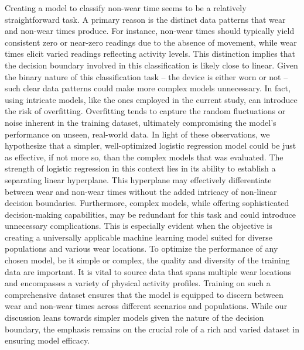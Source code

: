 \documentclass[
  10pt,
]{scrbook}
\begin{document}
Creating a model to classify non-wear time seems to be a relatively
straightforward task. A primary reason is the distinct data patterns
that wear and non-wear times produce. For instance, non-wear times
should typically yield consistent zero or near-zero readings due to the
absence of movement, while wear times elicit varied readings reflecting
activity levels. This distinction implies that the decision boundary
involved in this classification is likely close to linear. Given the
binary nature of this classification task -- the device is either worn
or not -- such clear data patterns could make more complex models
unnecessary. In fact, using intricate models, like the ones employed in
the current study, can introduce the risk of overfitting. Overfitting
tends to capture the random fluctuations or noise inherent in the
training dataset, ultimately compromising the model's performance on
unseen, real-world data. In light of these observations, we hypothesize
that a simpler, well-optimized logistic regression model could be just
as effective, if not more so, than the complex models that was
evaluated. The strength of logistic regression in this context lies in
its ability to establish a separating linear hyperplane. This hyperplane
may effectively differentiate between wear and non-wear times without
the added intricacy of non-linear decision boundaries. Furthermore,
complex models, while offering sophisticated decision-making
capabilities, may be redundant for this task and could introduce
unnecessary complications. This is especially evident when the objective
is creating a universally applicable machine learning model suited for
diverse populations and various wear locations. To optimize the
performance of any chosen model, be it simple or complex, the quality
and diversity of the training data are important. It is vital to source
data that spans multiple wear locations and encompasses a variety of
physical activity profiles. Training on such a comprehensive dataset
ensures that the model is equipped to discern between wear and non-wear
times across different scenarios and populations. While our discussion
leans towards simpler models given the nature of the decision boundary,
the emphasis remains on the crucial role of a rich and varied dataset in
ensuring model efficacy.
\end{document}
